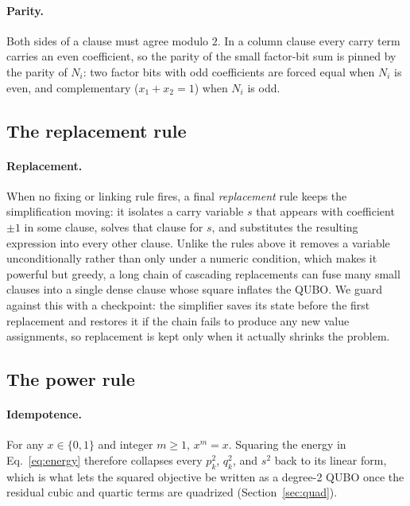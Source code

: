 \documentclass[reprint,twocolumn,amsmath,amssymb,nofootinbib]{revtex4-2}
\begin{document}
\paragraph{Parity.} Both sides of a clause must agree modulo $2$. In a column clause every carry term carries an even coefficient, so the parity of the small factor-bit sum is pinned by the parity of $N_i$: two factor bits with odd coefficients are forced equal when $N_i$ is even, and complementary ($x_1 + x_2 = 1$) when $N_i$ is odd.

\subsection{The replacement rule}

\paragraph{Replacement.} When no fixing or linking rule fires, a final \emph{replacement} rule keeps the simplification moving: it isolates a carry variable $s$ that appears with coefficient $\pm 1$ in some clause, solves that clause for $s$, and substitutes the resulting expression into every other clause. Unlike the rules above it removes a variable unconditionally rather than only under a numeric condition, which makes it powerful but greedy, a long chain of cascading replacements can fuse many small clauses into a single dense clause whose square inflates the QUBO. We guard against this with a checkpoint: the simplifier saves its state before the first replacement and restores it if the chain fails to produce any new value assignments, so replacement is kept only when it actually shrinks the problem.

\subsection{The power rule}

\paragraph{Idempotence.} For any $x \in \{0,1\}$ and integer $m \geq 1$, $x^m = x$. Squaring the energy in Eq.~\eqref{eq:energy} therefore collapses every $p_k^2$, $q_k^2$, and $s^2$ back to its linear form, which is what lets the squared objective be written as a degree-2 QUBO once the residual cubic and quartic terms are quadrized (Section~\ref{sec:quad}).

\end{document}
